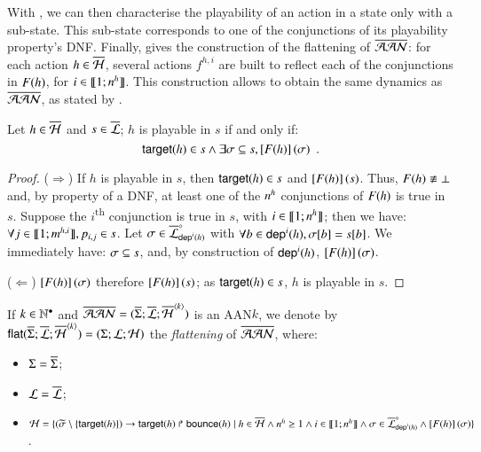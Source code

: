 With , we can then characterise the playability of an action in a state only with a sub-state.
This sub-state corresponds to one of the conjunctions of its playability property's DNF.
Finally,  gives the construction of the flattening of $\overline{\mathcal{AAN}}$:
for each action $h \in \overline{\mathcal{H}}$, several actions $f^{h,i}$ are built to reflect each of the conjunctions in $F(h)$,
\ie for $i \in \llbracket 1; n^{h} \rrbracket$.
This construction allows to obtain the same dynamics as $\overline{\mathcal{AAN}}$, as stated by .

\begin{lemma}
\label{lem:ppplaysubset}
  Let $h \in \overline{\mathcal{H}}$ and $s \in \overline{\mathcal{L}}$;
  $h$ is playable in $s$ if and only if:
  \[\mathsf{target}(h) \in s \wedge \exists \sigma \subseteq s, \left[F(h)\right](\sigma) \enspace.\]
\end{lemma}
%
\begin{proof}
  ($\Rightarrow$)
    If $h$ is playable in $s$, then $\mathsf{target}(h) \in s$ and $\left[F(h)\right](s)$.
    Thus, $F(h) \not\equiv \bot$ and, by property of a DNF,
    at least one of the $n^{h}$ conjunctions of $F(h)$ is true in $s$.
    Suppose the $i$\textsuperscript{th} conjunction is true in $s$, with $i \in \llbracket 1; n^{h} \rrbracket$;
    then we have: $\forall j \in \llbracket 1; m^{h,i} \rrbracket, p_{i,j} \in s$.
    Let $\sigma \in \overline{\mathcal{L}}^{\diamond}_{\mathsf{dep}^{i}(h)}$
    with $\forall b \in \mathsf{dep}^{i}(h), {\sigma[b]} = {s[b]}$.
    We immediately have: $\sigma \subseteq s$,
    and, by construction of $\mathsf{dep}^{i}(h)$, $\left[F(h)\right](\sigma)$.
  
  ($\Leftarrow$)
    $\left[F(h)\right](\sigma)$ therefore $\left[F(h)\right](s)$; as $\mathsf{target}(h) \in s$,
    $h$ is playable in $s$.
\end{proof}

\begin{definition}
  \label{def:flattening}
  If $k \in \mathbb{N}^\bullet$ and $\overline{\mathcal{AAN}} = (\overline{\Sigma}; \overline{\mathcal{L}}; \overline{\mathcal{H}}^{{\langle k \rangle}})$ is an AAN$k$,
  we denote by
  $\mathsf{flat}(\overline{\Sigma}; \overline{\mathcal{L}}; \overline{\mathcal{H}}^{{\langle k \rangle}}) = (\Sigma; \mathcal{L}; \mathcal{H})$
  the \emph{flattening} of $\overline{\mathcal{AAN}}$, where:
  \begin{itemize}
    \item $\Sigma = \overline{\Sigma}$;
    
    \item $\mathcal{L} = \overline{\mathcal{L}}$;
    
    \item $\mathcal{H} = \{
      (\widetilde{\sigma} \setminus \{ \mathsf{target}(h) \})\rightarrow\mathsf{target}(h)\Rsh\mathsf{bounce}(h) \mid
      h \in \overline{\mathcal{H}} \wedge n^{h} \geq 1 \wedge i \in \llbracket 1; n^{h} \rrbracket \wedge
      \sigma \in \overline{\mathcal{L}}^{\diamond}_{\mathsf{dep}^{i}(h)} \wedge
      \left[F(h)\right](\sigma) \}$.
  \end{itemize}
\end{definition}

